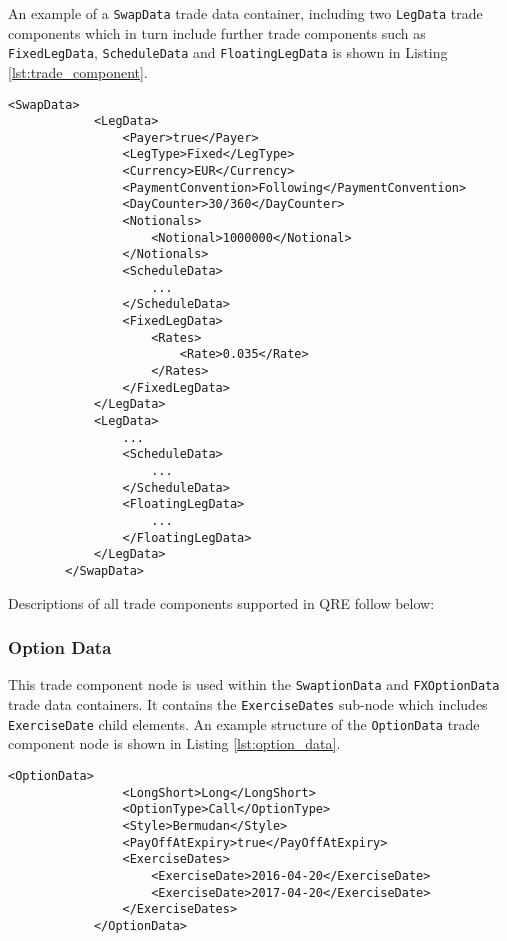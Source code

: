 \vspace{1em}

An example of a \lstinline!SwapData! trade data container, including two \lstinline!LegData! trade components which in turn include further trade components such as \lstinline!FixedLegData!, \lstinline!ScheduleData! and \lstinline!FloatingLegData! is shown in Listing \ref{lst:trade_component}.

\begin{lstlisting}[caption=Trade Components Example, label=lst:trade_component]
        <SwapData>
            <LegData>
                <Payer>true</Payer>
                <LegType>Fixed</LegType>
                <Currency>EUR</Currency>
                <PaymentConvention>Following</PaymentConvention>
                <DayCounter>30/360</DayCounter>
                <Notionals>
                    <Notional>1000000</Notional>
                </Notionals>
                <ScheduleData>
                	...
                </ScheduleData>
                <FixedLegData>
                    <Rates>
                        <Rate>0.035</Rate>
                    </Rates>
                </FixedLegData>
            </LegData>
            <LegData>
            	...
                <ScheduleData>
                	...
                </ScheduleData>
                <FloatingLegData>
                	...
                </FloatingLegData>
            </LegData>
        </SwapData>
 \end{lstlisting}

Descriptions of all trade components supported in QRE follow below:

\subsubsection{Option Data}
\label{ss:option_data} 
This trade component node is used within the \lstinline!SwaptionData! and \lstinline!FXOptionData! trade data containers. It contains the \lstinline!ExerciseDates! sub-node which includes  \lstinline!ExerciseDate! child elements. An example structure of the \lstinline!OptionData! trade component node is shown in Listing \ref{lst:option_data}.

\begin{lstlisting}[caption=OptionData, label=lst:option_data]
            <OptionData>
                <LongShort>Long</LongShort>
                <OptionType>Call</OptionType>
                <Style>Bermudan</Style>
                <PayOffAtExpiry>true</PayOffAtExpiry>
                <ExerciseDates>
                    <ExerciseDate>2016-04-20</ExerciseDate>
                    <ExerciseDate>2017-04-20</ExerciseDate>
                </ExerciseDates>
            </OptionData>
\end{lstlisting}

